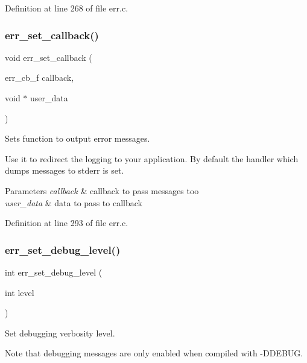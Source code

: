 Definition at line 268 of file err.\+c.

\mbox{\label{err_8c_ab9e9e148e2ab44b15a41a6e11a015c68}} 
\subsubsection{err\+\_\+set\+\_\+callback()}
{\footnotesize\ttfamily void err\+\_\+set\+\_\+callback (\begin{DoxyParamCaption}\item[{err\+\_\+cb\+\_\+f}]{callback,  }\item[{void $\ast$}]{user\+\_\+data }\end{DoxyParamCaption})}



Sets function to output error messages. 

Use it to redirect the logging to your application. By default the handler which dumps messages to stderr is set.


\begin{DoxyParams}{Parameters}
{\em callback} & callback to pass messages too \\
\hline
{\em user\+\_\+data} & data to pass to callback \\
\hline
\end{DoxyParams}


Definition at line 293 of file err.\+c.

\mbox{\label{err_8c_ac7956e03cd685da5fe6e134c462f73e1}} 
\subsubsection{err\+\_\+set\+\_\+debug\+\_\+level()}
{\footnotesize\ttfamily int err\+\_\+set\+\_\+debug\+\_\+level (\begin{DoxyParamCaption}\item[{int}]{level }\end{DoxyParamCaption})}



Set debugging verbosity level. 

Note that debugging messages are only enabled when compiled with -\/\+D\+D\+E\+B\+UG.


